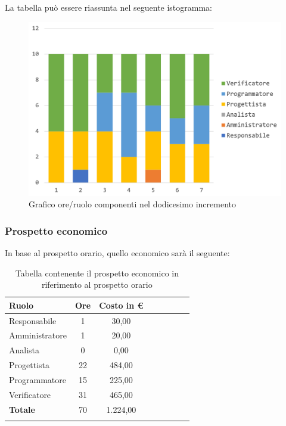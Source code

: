 		La tabella può essere riassunta nel seguente istogramma:
		\begin{figure}[H]
			\centering
			\includegraphics[width=0.8\linewidth]{./images/preventivo/incremento12-1.png}
			\caption{Grafico ore/ruolo componenti nel dodicesimo incremento}
			\label{fig:grafico suddivione ruoli incremento XII}
		\end{figure}
		
		\subsubsection{Prospetto economico}
		In base al prospetto orario, quello economico sarà il seguente: 
		
		\begin{longtable}{|l|c|c|c|c|c|c|c|}
			\hline
			\rowcolor{lighter-grayer}
			\textbf{Ruolo} & \textbf{Ore} & \textbf{Costo in € } \\
			\hline
			\endfirsthead
			
			\hline
			Responsabile 	    & 1 & 30,00\\
			\hline 
			\hline
			Amministratore	   & 1 & 20,00\\
			\hline
			\hline
			Analista 				& 0 & 0,00\\
			\hline
			\hline
			Progettista 		   & 22 & 484,00\\
			\hline
			\hline
			Programmatore 	  & 15 & 225,00\\
			\hline
			\hline
			Verificatore 		   & 31 & 465,00\\
			\hline
			\textbf{Totale} 	 & 70 & 1.224,00\\
			\hline
			\caption{Tabella contenente il prospetto economico in riferimento al prospetto orario}
		\end{longtable}
		\pagebreak
		
